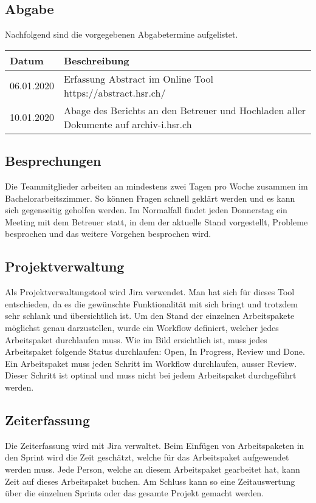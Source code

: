 \subsection{Abgabe}
Nachfolgend sind die vorgegebenen Abgabetermine aufgelistet.

\begin{center}
	\begin{tabularx}{\textwidth}{p{} p{}}
	\toprule
	Datum & Beschreibung \\ \midrule
	06.01.2020 & Erfassung Abstract im Online Tool https://abstract.hsr.ch/ \\
	10.01.2020 & Abage des Berichts an den Betreuer und Hochladen aller  \newline Dokumente auf archiv-i.hsr.ch \\ \bottomrule
	\end{tabularx}
\end{center}

\subsection{Besprechungen}
Die Teammitglieder arbeiten an mindestens zwei Tagen pro Woche zusammen im Bachelorarbeitszimmer. So können Fragen schnell geklärt werden und es kann sich gegenseitig geholfen werden. Im Normalfall findet jeden Donnerstag ein Meeting mit dem Betreuer statt, in dem der aktuelle Stand vorgestellt, Probleme besprochen und das weitere Vorgehen besprochen wird.

\subsection{Projektverwaltung}
Als Projektverwaltungstool wird Jira verwendet. Man hat sich für dieses Tool entschieden, da es die gewünschte Funktionalität mit sich bringt und trotzdem sehr schlank und übersichtlich ist. Um den Stand der einzelnen Arbeitspakete möglichst genau darzustellen, wurde ein Workflow definiert, welcher jedes Arbeitspaket durchlaufen muss.
Wie im Bild ersichtlich ist, muss jedes Arbeitspaket folgende Status durchlaufen: Open, In Progress, Review und Done. Ein Arbeitspaket muss jeden Schritt im Workflow durchlaufen, ausser Review. Dieser Schritt ist optinal und muss nicht bei jedem Arbeitspaket durchgeführt werden.

\subsection{Zeiterfassung}
Die Zeiterfassung wird mit Jira verwaltet. Beim Einfügen von Arbeitspaketen in den Sprint wird die Zeit geschätzt, welche für das Arbeitspaket aufgewendet werden muss. Jede Person, welche an diesem Arbeitspaket gearbeitet hat, kann Zeit auf dieses Arbeitspaket buchen. Am Schluss kann so eine Zeitauswertung über die einzelnen Sprints oder das gesamte Projekt gemacht werden.

\newpage